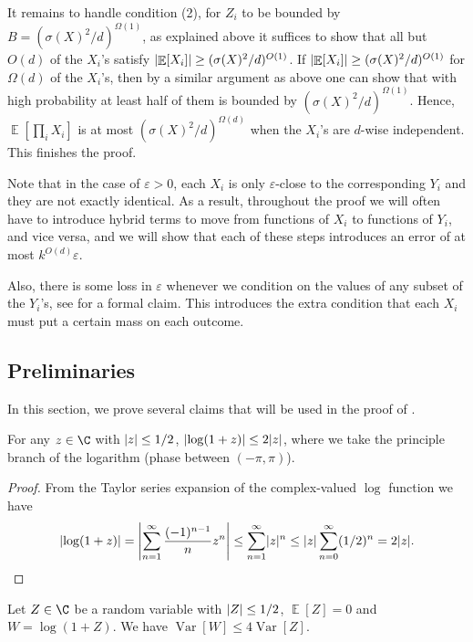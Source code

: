 \documentclass{toc}
\def\eps{\varepsilon}
\DeclarePairedDelimiter{\abs}{\lvert}{\rvert}
\DeclareMathOperator*{\E}{\mathbb{E}}                 %
\DeclareMathOperator*{\Var}{Var}                 %
\begin{document}
  It remains to handle condition (2), for $Z_i$ to be bounded by $B = (\sigma(X)^2/d)^{\Omega(1)}$, as explained above it suffices to show that all but $O(d)$ of the $X_i$'s satisfy $\abs{\E[X_i]} \ge (\sigma(X)^2/d)^{O(1)}$.
  If $\abs{\E[X_i]} \ge (\sigma(X)^2/d)^{O(1)}$ for $\Omega(d)$ of the $X_i$'s, then by a similar argument as above one can show that with high probability at least half of them is bounded by $(\sigma(X)^2/d)^{\Omega(1)}$.
  Hence, $\E[\prod_i X_i]$ is at most $(\sigma(X)^2/d)^{\Omega(d)}$ when the $X_i$'s are $d$-wise independent.
  This finishes the proof.

  Note that in the case of $\eps > 0$, each $X_i$ is only $\eps$-close to the corresponding $Y_i$ and they are not exactly identical.
  As a result, throughout the proof we will often have to introduce hybrid terms to move from functions of $X_i$ to functions of $Y_i$, and vice versa, and we will show that each of these steps introduces an error of at most $k^{O(d)} \eps$.

  Also, there is some loss in $\eps$ whenever we condition on the values of any subset of the $Y_i$'s, see  for a formal claim.
  This introduces the extra condition that each $X_i$ must put a certain mass on each outcome.

  \subsection{Preliminaries}
  In this section, we prove several claims that will be used in the proof of .

  \begin{lemma} \label{lemma-norm-log-of-z}
    For any $z \in \C$ with $\abs{z} \le 1/2$, $\abs{\log(1 + z)} \le 2\abs{z}$, where we take the principle branch of the logarithm (phase between $(-\pi, \pi)$).
  \end{lemma}
  \begin{proof}
    {}From the Taylor series expansion of the complex-valued $\log$ function we have
    \[
      \abs{\log(1 + z)} = \abs*{ \sum_{n = 1}^\infty \frac{(-1)^{n - 1}}{n} z^n } \le \sum_{n = 1}^\infty \abs{z}^n \le \abs{z} \sum_{n = 0}^\infty (1/2)^n = 2 \abs{z} . \qedhere
    \]
  \end{proof}

  \begin{lemma} \label{lemma-var-of-log}
    Let $Z \in \C$ be a random variable with $\abs{Z} \le 1/2$, $\E[Z] = 0$ and $W = \log(1 + Z)$.
    We have $\Var[W] \le 4 \Var[Z]$.
  \end{lemma}
\end{document}
